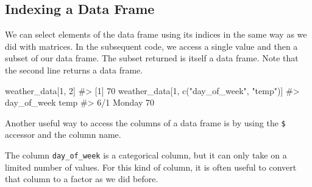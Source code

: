 \documentclass[
  letterpaper,
]{latex/krantz}
\makeatletter
\newenvironment{Shaded}{\begin{snugshade}}{\end{snugshade}}
\newcommand{\CommentTok}[1]{\textcolor[rgb]{0.37,0.37,0.37}{#1}}
\newcommand{\DecValTok}[1]{\textcolor[rgb]{0.68,0.00,0.00}{#1}}
\newcommand{\FunctionTok}[1]{\textcolor[rgb]{0.28,0.35,0.67}{#1}}
\newcommand{\NormalTok}[1]{\textcolor[rgb]{0.00,0.23,0.31}{#1}}
\newcommand{\OtherTok}[1]{\textcolor[rgb]{0.00,0.23,0.31}{#1}}
\newcommand{\SpecialCharTok}[1]{\textcolor[rgb]{0.37,0.37,0.37}{#1}}
\newcommand{\StringTok}[1]{\textcolor[rgb]{0.13,0.47,0.30}{#1}}
\newenvironment{kframe}{%
\medskip{}
\setlength{\fboxsep}{.8em}
 \def\at@end@of@kframe{}%
 \ifinner\ifhmode%
  \def\at@end@of@kframe{\end{minipage}}%
  \begin{minipage}{\columnwidth}%
 \fi\fi%
 \def\FrameCommand##1{\hskip\@totalleftmargin \hskip-\fboxsep
 \colorbox{shadecolor}{##1}\hskip-\fboxsep
     \hskip-\linewidth \hskip-\@totalleftmargin \hskip\columnwidth}%
 \MakeFramed {\advance\hsize-\width
   \@totalleftmargin\z@ \linewidth\hsize
   \@setminipage}}%
 {\par\unskip\endMakeFramed%
 \at@end@of@kframe}
\renewenvironment{Shaded}{\begin{kframe}}{\end{kframe}}
\makeatother
\begin{document}
\subsection{\texorpdfstring{Indexing a Data Frame
}{Indexing a Data Frame }}\label{indexing-a-data-frame}

We can select elements of the data frame using its indices in the same
way as we did with matrices. In the subsequent code, we access a single
value and then a subset of our data frame. The subset returned is itself
a data frame. Note that the second line returns a data frame.

\begin{Shaded}
\begin{Highlighting}[]
\NormalTok{weather\_data[}\DecValTok{1}\NormalTok{, }\DecValTok{2}\NormalTok{]}
\CommentTok{\#\textgreater{} [1] 70}
\NormalTok{weather\_data[}\DecValTok{1}\NormalTok{, }\FunctionTok{c}\NormalTok{(}\StringTok{"day\_of\_week"}\NormalTok{, }\StringTok{"temp"}\NormalTok{)]}
\CommentTok{\#\textgreater{}     day\_of\_week temp}
\CommentTok{\#\textgreater{} 6/1      Monday   70}
\end{Highlighting}
\end{Shaded}

Another useful way to access the columns of a data frame is by using the
\texttt{\$} accessor and the column name.

\begin{Shaded}
\end{Shaded}

The column \texttt{day\_of\_week} is a categorical column, but it can
only take on a limited number of values. For this kind of column, it is
often useful to convert that column to a factor as we did before.

\begin{Shaded}
\end{Shaded}
\end{document}
